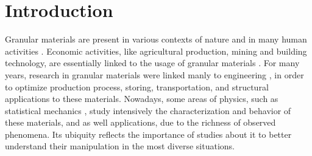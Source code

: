 
\chapter{Introduction}
\label{chap:Introducao}


    Granular materials are present in various contexts of nature and in many human activities \cite{Granular_Media_Between_Fluid_and_Solid, Sands_Powders_and_Grains, The_Physics_of_Granular_Media, Granular_Physics, Micromechanics_of_Granular_Materials}. Economic activities, like agricultural production, mining and building technology, are essentially linked to the usage of granular materials \cite{Sands_Powders_and_Grains}. For many years, research in granular materials were linked manly to engineering \cite{Abraao-Dissertacao, Versuche_uber_Getreidedruck_in_Silozellen, Janssen}, in order to optimize production process, storing, transportation, and structural applications to these materials. Nowadays, some areas of physics, such as statistical mechanics \cite{Unifying_Concepts_in_Granular_Media_and_Glasses}, study intensively the characterization and behavior of these materials, and as well applications, due to the richness of observed phenomena. Its ubiquity reflects the importance of studies about it to better understand their manipulation in the most diverse situations.

